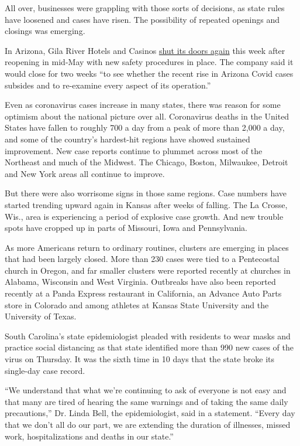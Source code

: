 All over, businesses were grappling with those sorts of decisions, as
state rules have loosened and cases have risen. The possibility of
repeated openings and closings was emerging.

In Arizona, Gila River Hotels and Casinos
\href{https://playatgila.com/wp-content/uploads/2020/06/GRGE-Closure-final.pdf}{shut
its doors again} this week after reopening in mid-May with new safety
procedures in place. The company said it would close for two weeks ``to
see whether the recent rise in Arizona Covid cases subsides and to
re-examine every aspect of its operation.''

Even as coronavirus cases increase in many states, there was reason for
some optimism about the national picture over all. Coronavirus deaths in
the United States have fallen to roughly 700 a day from a peak of more
than 2,000 a day, and some of the country's hardest-hit regions have
showed sustained improvement. New case reports continue to plummet
across most of the Northeast and much of the Midwest. The Chicago,
Boston, Milwaukee, Detroit and New York areas all continue to improve.

But there were also worrisome signs in those same regions. Case numbers
have started trending upward again in Kansas after weeks of falling. The
La Crosse, Wis., area is experiencing a period of explosive case growth.
And new trouble spots have cropped up in parts of Missouri, Iowa and
Pennsylvania.

As more Americans return to ordinary routines, clusters are emerging in
places that had been largely closed. More than 230 cases were tied to a
Pentecostal church in Oregon, and far smaller clusters were reported
recently at churches in Alabama, Wisconsin and West Virginia. Outbreaks
have also been reported recently at a Panda Express restaurant in
California, an Advance Auto Parts store in Colorado and among athletes
at Kansas State University and the University of Texas.

South Carolina's state epidemiologist pleaded with residents to wear
masks and practice social distancing as that state identified more than
990 new cases of the virus on Thursday. It was the sixth time in 10 days
that the state broke its single-day case record.

``We understand that what we're continuing to ask of everyone is not
easy and that many are tired of hearing the same warnings and of taking
the same daily precautions,'' Dr. Linda Bell, the epidemiologist, said
in a statement. ``Every day that we don't all do our part, we are
extending the duration of illnesses, missed work, hospitalizations and
deaths in our state.''


